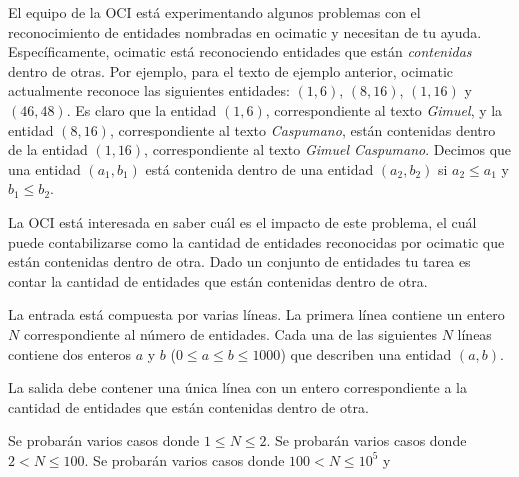 \documentclass{oci}
\begin{document}
\begin{problemDescription}

El equipo de la OCI está experimentando algunos problemas con el reconocimiento de
entidades nombradas en ocimatic y necesitan de tu ayuda.
Específicamente, ocimatic está reconociendo entidades que están \emph{contenidas}
dentro de otras.
Por ejemplo, para el texto de ejemplo anterior, ocimatic actualmente reconoce las
siguientes entidades: $(1, 6)$, $(8, 16)$, $(1, 16)$ y $(46, 48)$.
Es claro que la entidad $(1, 6)$, correspondiente al texto \emph{Gimuel}, y la
entidad $(8, 16)$, correspondiente al texto \emph{Caspumano}, están
contenidas dentro de la entidad $(1, 16)$, correspondiente al texto \emph{Gimuel
  Caspumano}.
Decimos que una entidad $(a_1,b_1)$ está contenida dentro de una entidad
$(a_2,b_2)$ si $a_2\leq a_1$ y $b_1\leq b_2$.

La OCI está interesada en saber cuál es el impacto de este problema, el cuál
puede contabilizarse como la cantidad de entidades reconocidas por ocimatic que
están contenidas dentro de otra.
Dado un conjunto de entidades tu tarea es contar la cantidad de entidades
que están contenidas dentro de otra.
\end{problemDescription}

\begin{inputDescription}
  La entrada está compuesta por varias líneas.
  La primera línea contiene un entero $N$ correspondiente al número de entidades.
  Cada una de las siguientes $N$ líneas contiene dos enteros $a$ y $b$ ($0\leq
  a\leq b \leq 1000$) que describen una entidad $(a,b)$.
\end{inputDescription}

\begin{outputDescription}
  La salida debe contener una única línea con un entero correspondiente a la cantidad de
  entidades que están contenidas dentro de otra.
\end{outputDescription}

\begin{scoreDescription}
   Se probarán varios casos donde $1\leq N\leq 2$.
   Se probarán varios casos donde $2< N \leq 100$.
   Se probarán varios casos donde $100< N \leq 10^5$ y 
\end{scoreDescription}

\begin{sampleDescription}
\end{sampleDescription}
\end{document}
